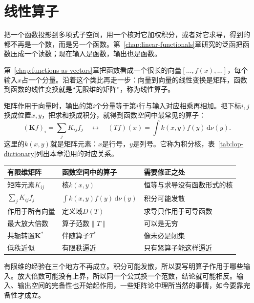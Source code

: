 \chapter{线性算子}
\label{chap:linear-operators}

把一个函数投影到多项式子空间，用一个核对它加权积分，或者对它求导，得到的都不再是一个数，而是另一个函数。第~\ref{chap:linear-functionals}章研究的泛函把函数压成一个读数；现在输入是函数，输出也是函数。

第~\ref{chap:functions-as-vectors}章把函数看成一个很长的向量$[\ldots,f(x),\ldots]$，每个输入$x$占一个分量。沿着这个类比再走一步：向量到向量的线性变换是矩阵，函数到函数的线性变换就是“无限维的矩阵”，称为线性算子。

矩阵作用于向量时，输出的第$i$个分量等于第$i$行与输入对应相乘再相加。把下标$i,j$换成位置$x,y$，把求和换成积分，就得到函数空间中最常见的算子：
\begin{equation}
 (\bm Kf)_i=\sum_jK_{ij}f_j
 \quad\longleftrightarrow\quad
 (Tf)(x)=\int k(x,y)f(y)\,\mathrm d\nu(y).
 \label{eq:lop-matrix-integral}
\end{equation}
这里的$k(x,y)$就是矩阵元素：$x$是行号，$y$是列号。它称为积分核，表~\ref{tab:lop-dictionary}列出本章沿用的对应关系。

\begin{BookInlineTable}
  \centering
  \caption{矩阵与线性算子的对应，以及类比需要修正的地方。}
  \label{tab:lop-dictionary}
  \begin{tabular}{lll}
    \toprule
    有限维矩阵 & 函数空间中的算子 & 需要修正之处\\
    \midrule
    矩阵元素$K_{ij}$ & 核$k(x,y)$ & 恒等与求导没有函数形式的核\\
    $\sum_jK_{ij}f_j$ & $\int k(x,y)f(y)\,\mathrm d\nu(y)$ & 积分可能发散\\
    作用于所有向量 & 定义域$D(T)$ & 求导只作用于可导函数\\
    最大放大倍数 & 算子范数$\lVert T\rVert$ & 可以是无穷\\
    共轭转置$\bm K^*$ & 伴随算子$T^*$ & 像未必是闭集\\
    低秩近似 & 有限秩逼近 & 只有紧算子能这样逼近\\
    \bottomrule
  \end{tabular}
\end{BookInlineTable}

有限维的经验在三个地方不再成立。积分可能发散，所以要写明算子作用于哪些输入。放大倍数可能没有上界，所以同一个公式换一个范数，结论就可能相反。输入、输出空间的完备性也开始起作用，一些矩阵论中理所当然的事情，如今要靠完备性才成立。

